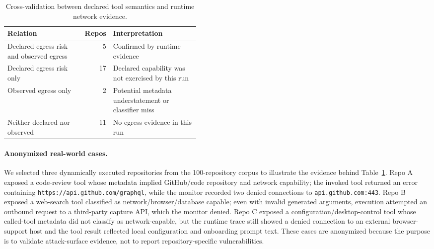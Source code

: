 \begin{table}[t]
\centering
\caption{Cross-validation between declared tool semantics and runtime network evidence.}
\label{tab:semantic-cross-validation}
\begin{tabular}{lrp{0.45\linewidth}}
\toprule
Relation & Repos & Interpretation \\
\midrule
Declared egress risk and observed egress & 5 & Confirmed by runtime evidence \\
Declared egress risk only & 17 & Declared capability was not exercised by this run \\
Observed egress only & 2 & Potential metadata understatement or classifier miss \\
Neither declared nor observed & 11 & No egress evidence in this run \\
\bottomrule
\end{tabular}
\end{table}

\paragraph{Anonymized real-world cases.}
We selected three dynamically executed repositories from the 100-repository
corpus to illustrate the evidence behind Table~\ref{tab:semantic-cross-validation}.
Repo A exposed a code-review tool whose metadata implied GitHub/code repository
and network capability; the invoked tool returned an error containing
\texttt{https://api.github.com/graphql}, while the monitor recorded two denied
connections to \texttt{api.github.com:443}. Repo B exposed a web-search tool
classified as network/browser/database capable; even with invalid generated
arguments, execution attempted an outbound request to a third-party capture API,
which the monitor denied. Repo C exposed a configuration/desktop-control tool
whose called-tool metadata did not classify as network-capable, but the runtime
trace still showed a denied connection to an external browser-support host and
the tool result reflected local configuration and onboarding prompt text. These
cases are anonymized because the purpose is to validate attack-surface evidence,
not to report repository-specific vulnerabilities.
